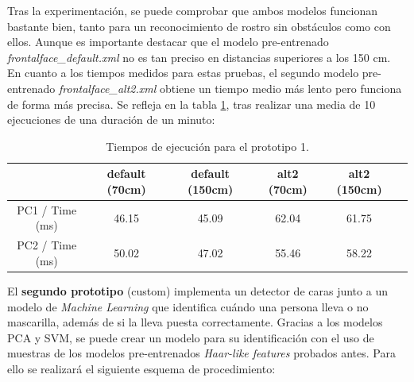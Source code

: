 Tras la experimentación, se puede comprobar que ambos modelos funcionan bastante bien, tanto para un reconocimiento de rostro sin obstáculos como con ellos. Aunque es importante destacar que el modelo pre-entrenado \textit{frontalface\_default.xml} no es tan preciso en distancias superiores a los 150 cm. En cuanto a los tiempos medidos para estas pruebas, el segundo modelo pre-entrenado \textit{frontalface\_alt2.xml} obtiene un tiempo medio más lento pero funciona de forma más precisa. Se refleja en la tabla \ref{tab:table2}, tras realizar una media de 10 ejecuciones de una duración de un minuto:

\begin{table}[h!]
	\begin{center}
		\begin{tabular}{ |c|c|c|c|c|c| } 
			\hline
			& default (70cm) & default (150cm) & alt2 (70cm) & alt2 (150cm) \\
			\hline
			PC1 / Time (ms) & 46.15  & 45.09 & 62.04  & 61.75 \\
			\hline
			PC2 / Time (ms) & 50.02  & 47.02 & 55.46  & 58.22 \\
			\hline
		\end{tabular}
		\caption{Tiempos de ejecución para el prototipo 1.}
		\label{tab:table2}
	\end{center}
\end{table}

El \textbf{segundo prototipo} (custom) implementa un detector de caras junto a un modelo de \textit{Machine Learning} que identifica cuándo una persona lleva o no mascarilla, además de si la lleva puesta correctamente. Gracias a los modelos PCA y SVM, se puede crear un modelo para su identificación con el uso de muestras de los modelos pre-entrenados \textit{Haar-like features} probados antes. Para ello se realizará el siguiente esquema de procedimiento:

